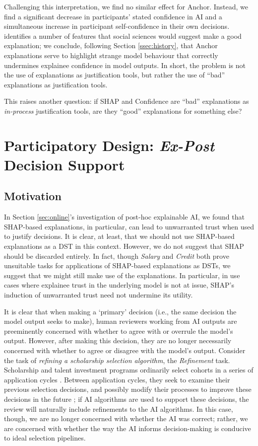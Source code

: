 Challenging this interpretation, we find no similar effect for Anchor. Instead, we find a significant decrease in participants' stated confidence in AI and a simultaneous increase in participant self-confidence in their own decisions. \textcite{Miller} identifies a number of features that social sciences would suggest make a good explanation; we conclude, following Section \ref{ssec:history}, that Anchor explanations serve to highlight strange model behaviour that correctly undermines explainee confidence in model outputs. In short, the problem is not the use of explanations as justification tools, but rather the use of ``bad'' explanations as justification tools.

This raises another question: if SHAP and Confidence are ``bad'' explanations as \emph{in-process} justification tools, are they ``good'' explanations for something else?

\section{Participatory Design: \emph{Ex-Post} Decision Support}\label{sec:case}
\subsection{Motivation}
In Section \ref{sec:online}'s investigation of post-hoc explainable AI, we found that SHAP-based explanations, in particular, can lead to unwarranted trust when used to justify decisions. It is clear, at least, that we should not use SHAP-based explanations as a DST in this context. However, we do not suggest that SHAP should be discarded entirely. In fact, though \emph{Salary} and \emph{Credit} both prove unsuitable tasks for applications of SHAP-based explanations as DSTs, we suggest that we might still make use of the explanations. In particular, in use cases where explainee trust in the underlying model is not at issue, SHAP's induction of unwarranted trust need not undermine its utility.

It is clear that when making a `primary' decision (i.e., the same decision the model output seeks to make), human reviewers working from AI outputs are preeminently concerned with whether to agree with or overrule the model's output. However, after making this decision, they are no longer necessarily concerned with whether to agree or disagree with the model's output. Consider the task of \emph{refining a scholarship selection algorithm}, the \emph{Refinement} task. Scholarship and talent investment programs ordinarily select cohorts in a series of application cycles \cite{li2020hiring}. Between application cycles, they seek to examine their previous selection decisions, and possibly modify their processes to improve these decisions in the future \cite{li2020hiring}; if AI algorithms are used to support these decisions, the review will naturally include refinements to the AI algorithms. In this case, though, we are no longer concerned with whether the AI was correct; rather, we are concerned with whether the way the AI informs decision-making is conducive to ideal selection pipelines.

